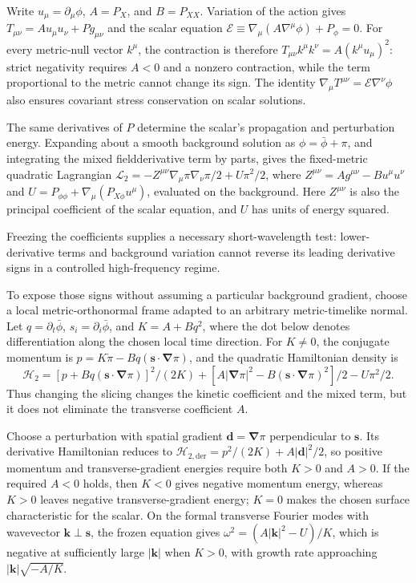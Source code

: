 \documentclass[11pt]{article}
\begin{document}
Write $u_\mu=\partial_\mu\phi$, $A=P_X$, and $B=P_{XX}$. Variation of the action gives $T_{\mu\nu}=A u_\mu u_\nu+P g_{\mu\nu}$ and the scalar equation $\mathcal E\equiv\nabla_\mu(A\nabla^\mu\phi)+P_\phi=0$. For every metric-null vector $k^\mu$, the contraction is therefore $T_{\mu\nu}k^\mu k^\nu=A(k^\mu u_\mu)^2$: strict negativity requires $A<0$ and a nonzero contraction, while the term proportional to the metric cannot change its sign. The identity $\nabla_\mu T^{\mu\nu}=\mathcal E\nabla^\nu\phi$ also ensures covariant stress conservation on scalar solutions.

The same derivatives of $P$ determine the scalar\textquoteright{}s propagation and perturbation energy. Expanding about a smooth background solution as $\phi=\bar\phi+\pi$, and integrating the mixed field\textendash{}\allowbreak{}derivative term by parts, gives the fixed-metric quadratic Lagrangian $\mathcal L_2=-Z^{\mu\nu}\nabla_\mu\pi\nabla_\nu\pi/2+U\pi^2/2$, where $Z^{\mu\nu}=A g^{\mu\nu}-B u^\mu u^\nu$ and $U=P_{\phi\phi}+\nabla_\mu(P_{X\phi}u^\mu)$, evaluated on the background. Here $Z^{\mu\nu}$ is also the principal coefficient of the scalar equation, and $U$ has units of energy squared.

Freezing the coefficients supplies a necessary short-wavelength test: lower-derivative terms and background variation cannot reverse its leading derivative signs in a controlled high-frequency regime.

To expose those signs without assuming a particular background gradient, choose a local metric-orthonormal frame adapted to an arbitrary metric-timelike normal. Let $q=\partial_t\bar\phi$, $s_i=\partial_i\bar\phi$, and $K=A+Bq^2$, where the dot below denotes differentiation along the chosen local time direction. For $K\ne0$, the conjugate momentum is $p=K\dot\pi-Bq(\mathbf s\cdot\boldsymbol\nabla\pi)$, and the quadratic Hamiltonian density is \[\mathcal H_2=[p+Bq(\mathbf s\cdot\boldsymbol\nabla\pi)]^2/(2K)+[A|\boldsymbol\nabla\pi|^2-B(\mathbf s\cdot\boldsymbol\nabla\pi)^2]/2-U\pi^2/2.\] Thus changing the slicing changes the kinetic coefficient and the mixed term, but it does not eliminate the transverse coefficient $A$.

Choose a perturbation with spatial gradient $\mathbf d=\boldsymbol\nabla\pi$ perpendicular to $\mathbf s$. Its derivative Hamiltonian reduces to $\mathcal H_{2,\mathrm{der}}=p^2/(2K)+A|\mathbf d|^2/2$, so positive momentum and transverse-gradient energies require both $K>0$ and $A>0$. If the required $A<0$ holds, then $K<0$ gives negative momentum energy, whereas $K>0$ leaves negative transverse-gradient energy; $K=0$ makes the chosen surface characteristic for the scalar. On the formal transverse Fourier modes with wavevector $\mathbf k\perp\mathbf s$, the frozen equation gives $\omega^2=(A|\mathbf k|^2-U)/K$, which is negative at sufficiently large $|\mathbf k|$ when $K>0$, with growth rate approaching $|\mathbf k|\sqrt{-A/K}$.
\end{document}
